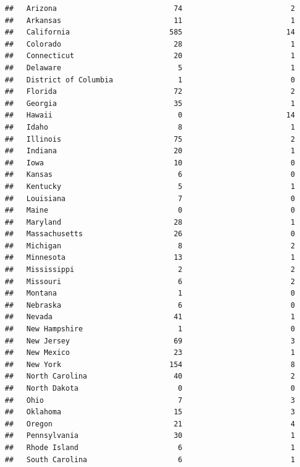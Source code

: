 \documentclass[]{book}
\theoremstyle{definition}
\theoremstyle{definition}
\theoremstyle{definition}
\theoremstyle{remark}
\begin{document}
\begin{verbatim}
##   Arizona                           74                         2
##   Arkansas                          11                         1
##   California                       585                        14
##   Colorado                          28                         1
##   Connecticut                       20                         1
##   Delaware                           5                         1
##   District of Columbia               1                         0
##   Florida                           72                         2
##   Georgia                           35                         1
##   Hawaii                             0                        14
##   Idaho                              8                         1
##   Illinois                          75                         2
##   Indiana                           20                         1
##   Iowa                              10                         0
##   Kansas                             6                         0
##   Kentucky                           5                         1
##   Louisiana                          7                         0
##   Maine                              0                         0
##   Maryland                          28                         1
##   Massachusetts                     26                         0
##   Michigan                           8                         2
##   Minnesota                         13                         1
##   Mississippi                        2                         2
##   Missouri                           6                         2
##   Montana                            1                         0
##   Nebraska                           6                         0
##   Nevada                            41                         1
##   New Hampshire                      1                         0
##   New Jersey                        69                         3
##   New Mexico                        23                         1
##   New York                         154                         8
##   North Carolina                    40                         2
##   North Dakota                       0                         0
##   Ohio                               7                         3
##   Oklahoma                          15                         3
##   Oregon                            21                         4
##   Pennsylvania                      30                         1
##   Rhode Island                       6                         1
##   South Carolina                     6                         1

\end{verbatim}
\end{document}
